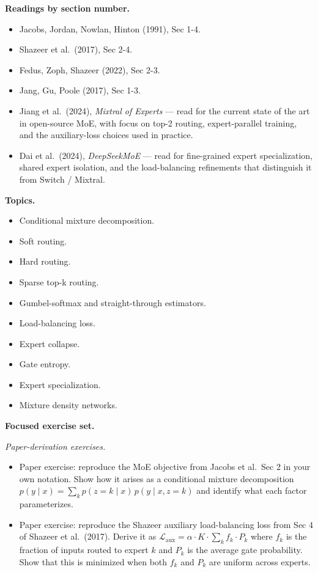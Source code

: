 \textbf{Readings by section number.}

\begin{itemize}
\tightlist
\item
  Jacobs, Jordan, Nowlan, Hinton (1991), Sec 1-4.
\item
  Shazeer et al.~(2017), Sec 2-4.
\item
  Fedus, Zoph, Shazeer (2022), Sec 2-3.
\item
  Jang, Gu, Poole (2017), Sec 1-3.
\item
  Jiang et al.~(2024), \emph{Mixtral of Experts} --- read for the
  current state of the art in open-source MoE, with focus on top-2
  routing, expert-parallel training, and the auxiliary-loss choices used
  in practice.
\item
  Dai et al.~(2024), \emph{DeepSeekMoE} --- read for fine-grained expert
  specialization, shared expert isolation, and the load-balancing
  refinements that distinguish it from Switch / Mixtral.
\end{itemize}

\textbf{Topics.}

\begin{itemize}
\tightlist
\item
  Conditional mixture decomposition.
\item
  Soft routing.
\item
  Hard routing.
\item
  Sparse top-k routing.
\item
  Gumbel-softmax and straight-through estimators.
\item
  Load-balancing loss.
\item
  Expert collapse.
\item
  Gate entropy.
\item
  Expert specialization.
\item
  Mixture density networks.
\end{itemize}

\textbf{Focused exercise set.}

\emph{Paper-derivation exercises.}

\begin{itemize}
\tightlist
\item
  Paper exercise: reproduce the MoE objective from Jacobs et al.~Sec 2
  in your own notation. Show how it arises as a conditional mixture
  decomposition
  \(p(y \mid x) = \sum_k p(z = k \mid x) \, p(y \mid x, z = k)\) and
  identify what each factor parameterizes.
\item
  Paper exercise: reproduce the Shazeer auxiliary load-balancing loss
  from Sec 4 of Shazeer et al.~(2017). Derive it as
  \(\mathcal{L}_{\text{aux}} = \alpha \cdot K \cdot \sum_k f_k \cdot P_k\)
  where \(f_k\) is the fraction of inputs routed to expert \(k\) and
  \(P_k\) is the average gate probability. Show that this is minimized
  when both \(f_k\) and \(P_k\) are uniform across experts.
\end{itemize}

